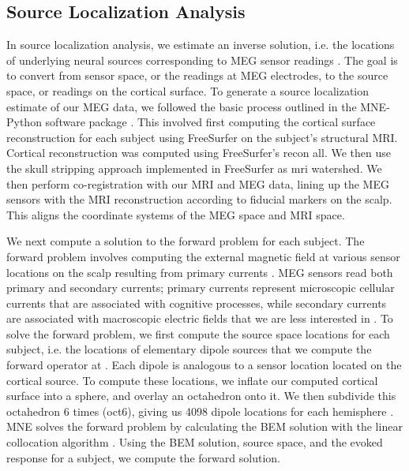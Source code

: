 \documentclass[../main.tex]{subfiles}
\begin{document}
\subsection{Source Localization Analysis}
In source localization analysis, we estimate an inverse solution, i.e. the locations of underlying neural sources corresponding to MEG sensor readings \citep{mne}. The goal is to convert from sensor space, or the readings at MEG electrodes, to the source space, or readings on the cortical surface. To generate a source localization estimate of our MEG data, we followed the basic process outlined in the MNE-Python software package \citep{mne}. This involved first computing the cortical surface reconstruction for each subject using FreeSurfer on the subject's structural MRI. Cortical reconstruction was computed using FreeSurfer's recon all. We then use the skull stripping approach \citep{segonne_2004} implemented in FreeSurfer as mri watershed. We then perform co-registration with our MRI and MEG data, lining up the MEG sensors with the MRI reconstruction according to fiducial markers on the scalp. This aligns the coordinate systems of the MEG space and MRI space.

We next compute a solution to the forward problem for each subject. The forward problem involves computing the external magnetic field at various sensor locations on the scalp resulting from primary currents \citep{mosher99}. MEG sensors read both primary and secondary currents; primary currents represent microscopic cellular currents that are associated with cognitive processes, while secondary currents are associated with macroscopic electric fields that we are less interested in \citep{mosher99}. To solve the forward problem, we first compute the source space locations for each subject, i.e. the locations of elementary dipole sources that we compute the forward operator at \cite{mne}. Each dipole is analogous to a sensor location located on the cortical source. To compute these locations, we inflate our computed cortical surface into a sphere, and overlay an octahedron onto it. We then subdivide this octahedron 6 times (oct6), giving us 4098 dipole locations for each hemisphere \cite{mne}. MNE solves the forward problem by calculating the BEM solution with the linear collocation algorithm \citep{mosher99, hamalainen89}. Using the BEM solution, source space, and the evoked response for a subject, we compute the forward solution.
\end{document}
